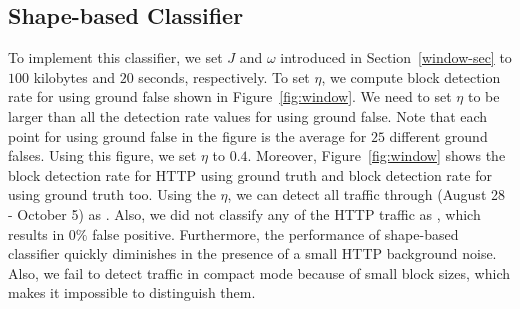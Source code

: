 \begin{comment}
\subsubsection{The \code{D2U} Classifier}
We showed in Appendix~\ref{sec:charachterzing_bc} that downstream to upstream ratio of \bc traffic could be a distinguishing factor to identify \bc from other traffics. D2U classifier attempts to use the symmetry between upstream and downstream of \bc traffic to distinguish it from other protocols. Figure~\ref{fig:d2u} shows the result of this classifier on noisy user profile for full and compact block modes. It indicates that increasing T and thus decreasing the background noise on \bc traffic would improve the 
detection rate. More specifically, our true positive enhances from $0$ to $80\%$ when we increase T from $0$ to $2$ minutes.
\end{comment}


\subsection{Shape-based Classifier}
To implement this classifier, we set $J$ and $\omega$ introduced in Section~\ref{window-sec} to $100$ kilobytes and $20$ seconds, respectively. 
To set $\eta$, we compute block detection rate for \bc using ground false shown in Figure~\ref{fig:window}. We need to set $\eta$ to be larger than all the detection rate values for \bc using ground false. Note that each point for \bc using ground false in the figure is the average for $25$ different ground falses. Using this figure, we set $\eta$ to $0.4$. Moreover, Figure~\ref{fig:window} shows the block detection rate for HTTP using ground truth and block detection rate for \bc using ground truth too. Using the $\eta$, we can detect all \bc traffic through (August 28 - October 5) as \bc. Also, we did not classify any of the HTTP traffic as \bc, which results in $0\%$ false positive. Furthermore, the performance of shape-based classifier quickly diminishes in the presence of a small HTTP background noise. Also, we fail to detect \bc traffic in compact mode because of small block sizes, which makes it impossible to distinguish them.

 
